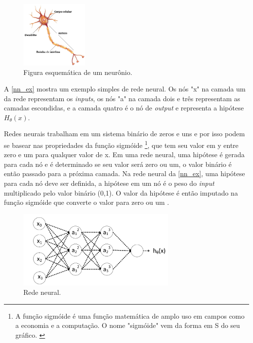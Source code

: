 \begin{figure}[H]
	\caption{\label{neuron}Figura esquemática de um neurônio.}
	\begin{center}
		\includegraphics[width=0.3\textwidth]{capitulo_3/neuronio.jpg}
	\end{center}
\end{figure}

A \autoref{nn_ex} mostra um exemplo simples de rede neural. Os nós "x" na camada um da rede representam os \textit{inputs}, os nós "a" na camada dois e três representam as camadas escondidas, e a camada quatro é o nó de \textit{output} e representa a hipótese $H_\theta(x)$.

Redes neurais trabalham em um sistema binário de zeros e uns e por isso podem se basear nas propriedades da função sigmóide \footnote{A função sigmóide é uma função matemática de amplo uso em campos como a economia e a computação. O nome "sigmóide" vem da forma em S do seu gráfico. \cite{wiki:sigmoid}}, que tem seu valor em y entre zero e um para qualquer valor de x. Em uma rede neural, uma hipótese é gerada para cada nó e é determinado se seu valor será zero ou um, o valor binário é então passado para a próxima camada. Na rede neural da \autoref{nn_ex}, uma hipótese para cada nó deve ser definida, a hipótese em um nó é o peso do \textit{input} multiplicado pelo valor binário (0,1). O valor da hipótese é então imputado na função sigmóide que converte o valor para zero ou um \cite{samson_intro_ml}.

\begin{figure}[H]
	\caption{\label{nn_ex}Rede neural.}
	\begin{center}
		\includegraphics[width=0.7\textwidth]{capitulo_3/NN_ex.png}
	\end{center}
\end{figure}

